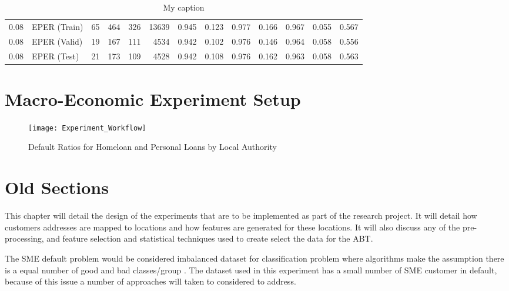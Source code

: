 \begin{table}[H]
{\begin{tabular}{l|l|r|r|r|r|r|r|r|r|r|r|r}
			0.08            & EPER (Train)    & 65          & 464         & 326         & 13639       & 0.945             & 0.123              & 0.977        & 0.166           & 0.967                & 0.055  & 0.567     \\
			0.08            & EPER (Valid)    & 19          & 167         & 111         & 4534        & 0.942             & \cellcolor{yellow!25}0.102              & 0.976        & 0.146           & 0.964                & 0.058    & 0.556   \\
			0.08            & EPER (Test)     & 21          & 173         & 109         & 4528        & 0.942             & 0.108              & 0.976        & 0.162           & 0.963                & 0.058 & 0.563     \\ \hline
		\end{tabular}
	}
	\caption{My caption}
	\label{my-label}
\end{table}




\section{Macro-Economic Experiment Setup }

\begin{figure}[H]
	\texttt{[image: Experiment\_Workflow]}
	\caption{Default Ratios for Homeloan and Personal Loans by Local Authority}
	\label{fig:Experiment_Workflow}
\end{figure}


\pagebreak


\section{Old Sections}
This chapter will detail the design of the experiments that are to be implemented as part of the research project. It will detail how customers addresses are mapped to locations and how features are generated for these locations. It will also discuss any of the pre-processing, and feature selection and statistical techniques used to create select the data for the ABT.

The SME default problem would be considered imbalanced dataset for classification problem where algorithms make the assumption there is a equal number of good and bad classes/group \citep{japkowicz_class_2000}. The dataset used in this experiment has a small number of SME customer in default, because of this issue a number of approaches will taken to considered to address.

